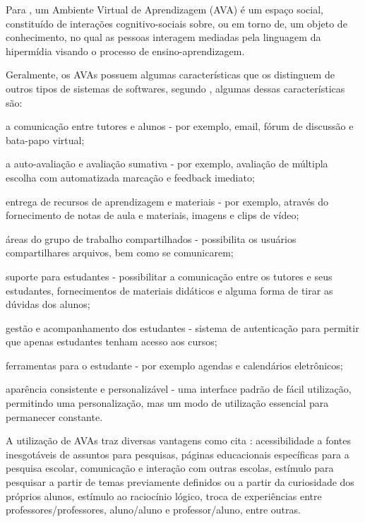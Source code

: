Para , um Ambiente Virtual de Aprendizagem (AVA) é um espaço social, constituído de interações cognitivo-sociais sobre, ou em torno de, um objeto de conhecimento, no qual as pessoas interagem mediadas pela linguagem da hipermídia visando o processo de ensino-aprendizagem.

Geralmente, os AVAs possuem algumas características que os distinguem de outros tipos de sistemas de softwares, segundo , algumas dessas características são:
\begin{alineascomponto}
    \item a comunicação entre tutores e alunos - por exemplo, email, fórum de discussão e bata-papo virtual;
    \item a auto-avaliação e avaliação sumativa - por exemplo, avaliação de múltipla escolha com automatizada marcação e feedback imediato; 
    \item entrega de recursos de aprendizagem e materiais - por exemplo, através do fornecimento de notas de aula e materiais, imagens e clips de vídeo;
    \item áreas do grupo de trabalho compartilhados - possibilita os usuários compartilhares arquivos, bem como se comunicarem;
    \item suporte para estudantes - possibilitar a comunicação entre os tutores e seus estudantes, fornecimentos de materiais didáticos e alguma forma de tirar as dúvidas dos alunos;
    \item gestão e acompanhamento dos estudantes - sistema de autenticação para permitir que apenas estudantes tenham acesso aos cursos;
    \item ferramentas para o estudante - por exemplo agendas e calendários eletrônicos;
    \item aparência consistente e personalizável - uma interface padrão de fácil utilização, permitindo uma personalização, mas um modo de utilização essencial para permanecer constante.
\end{alineascomponto}

A utilização de AVAs traz diversas vantagens como cita : acessibilidade a fontes inesgotáveis de assuntos para pesquisas, páginas educacionais específicas para a pesquisa escolar, comunicação e interação com outras escolas, estímulo para pesquisar a partir de temas previamente definidos ou a partir da curiosidade dos próprios alunos, estímulo ao raciocínio lógico, troca de experiências entre professores/professores, aluno/aluno e professor/aluno, entre outras.

